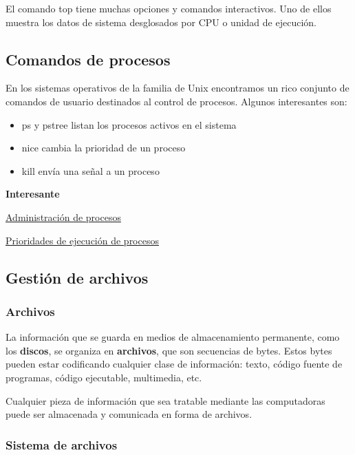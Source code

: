 \documentclass[spanish,A4,]{article}
\begin{document}
El comando top tiene muchas opciones y comandos interactivos. Uno de
ellos muestra los datos de sistema desglosados por CPU o unidad de
ejecución.

\subsection{Comandos de procesos}\label{comandos-de-procesos}

En los sistemas operativos de la familia de Unix encontramos un rico
conjunto de comandos de usuario destinados al control de procesos.
Algunos interesantes son:

\begin{itemize}
\itemsep1pt\parskip0pt
\item
  ps y pstree listan los procesos activos en el sistema
\item
  nice cambia la prioridad de un proceso
\item
  kill envía una señal a un proceso
\end{itemize}

\textbf{Interesante}

\href{https://www.ibm.com/developerworks/ssa/linux/library/l-lpic1-v3-103-5/}{Administración
de procesos}

\href{https://www.ibm.com/developerworks/ssa/linux/library/l-lpic1-v3-103-6}{Prioridades
de ejecución de procesos}

\subsection{Gestión de archivos}\label{gestiuxf3n-de-archivos}

\subsubsection{Archivos}\label{archivos}

La información que se guarda en medios de almacenamiento permanente,
como los \textbf{discos}, se organiza en \textbf{archivos}, que son
secuencias de bytes. Estos bytes pueden estar codificando cualquier
clase de información: texto, código fuente de programas, código
ejecutable, multimedia, etc.

Cualquier pieza de información que sea tratable mediante las
computadoras puede ser almacenada y comunicada en forma de archivos.

\subsubsection{Sistema de archivos}\label{sistema-de-archivos}
\end{document}
